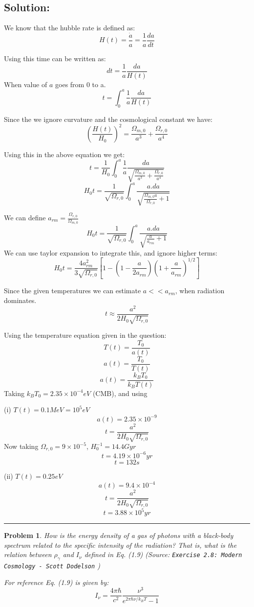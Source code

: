 \documentclass[11pt]{article}
\newenvironment{solution}{\subsection*{Solution:}}{\vspace{0.5cm} \hrule \vspace{0.7cm}}
\newtheorem{problem}{Problem}
\begin{document}
\begin{solution}

	We know that the hubble rate is defined as:
	$$ H(t) = \frac{\dot a }{a} = \frac{1}{a} \frac{da}{dt} $$

	Using this time can be written as:
	$$ dt = \frac{1}{a} \frac{da}{H(t)} $$
	When value of $a$ goes from 0 to a.
	$$ t = \int^a_0 \frac{1}{a} \frac{da}{H(t)} $$

	Since the we ignore curvature and the cosmological constant we have:
	$$ \left(\frac{H(t)}{H_0}\right)^2 = \frac{\Omega_{m,0}}{a^3} + \frac{\Omega_{r,0}}{a^4}  $$

	Using this in the above equation we get:
	$$ t = \frac{1}{H_0} \int^a_0 \frac{1}{a} \frac{da}{\sqrt{\frac{\Omega_{m,0}}{a^3} + \frac{\Omega_{r,0}}{a^4}}} $$
	$$ H_0 t = \frac{1}{\sqrt{\Omega_{r,0}}} \int^a_0
	\frac{a.da}{\sqrt{\frac{\Omega_{m,0}a}{\Omega_{r,0}} + 1}} $$

	We can define $a_{rm} = \frac{\Omega_{r,0}}{\Omega_{m,0}}$
	$$ H_0 t = \frac{1}{\sqrt{\Omega_{r,0}}} \int^a_0
	\frac{a.da}{\sqrt{\frac{a}{a_{rm}} + 1}} $$
	We can use taylor expansion to integrate this, and ignore higher terms:
	$$ H_0 t = \frac{4a^2_{rm}}{3\sqrt{\Omega_{r,0}}}\left[ 1 - \left(1 -
	\frac{a}{2a_{rm}}\right)\left( 1 + \frac{a}{a_{rm}} \right)^{1/2} \right] $$

	Since the given temperatures we can estimate $a << a_{rm}$, when
	radiation dominates.
	$$ t  \approx  \frac{a^2}{2H_0\sqrt{\Omega_{r,0}}}$$

	Using the temperature equation given in the question:
	$$ T(t) = \frac{T_0}{a(t)} $$
	$$ a(t) = \frac{T_0}{T(t)} $$
	$$ a(t) = \frac{k_B T_0}{k_B T(t)} $$
	Taking $k_B T_0 = 2.35\times 10^{-4} eV$ (CMB), and using

	(i) $T(t) = 0.1 MeV = 10^5 eV$
	$$ a(t) = 2.35 \times 10^{-9} $$
	$$ t  =  \frac{a^2}{2H_0\sqrt{\Omega_{r,0}}}$$
	Now taking $\Omega_{r,0} = 9 \times 10^{-5}$, $H_0^{-1} = 14.4 Gyr$
	$$ t  = 4.19 \times 10^{-6} yr $$
	$$ t  = 132 s $$

	(ii) $T(t) = 0.25 eV$
	$$ a(t) = 9.4 \times 10^{-4} $$
	$$ t  =  \frac{a^2}{2H_0\sqrt{\Omega_{r,0}}}$$
	$$ t  = 3.88 \times 10^5 yr $$


\end{solution}

\begin{problem}
	How is the energy density of a gas of photons with a black-body spectrum
	related to
	the specific intensity of the radiation? That is, what is the relation
	between $\rho_{\gamma}$ and $I_{\nu}$
	defined in Eq. (1.9) (Source: \texttt{Exercise 2.8: Modern Cosmology - Scott Dodelson} )

For reference Eq. (1.9) is given by:
	$$ I_\nu = \frac{4\pi\hbar}{c^2} \frac{\nu^3}{e^{2\pi\hbar\nu/k_BT} - 1} $$


\end{problem}
\end{document}
